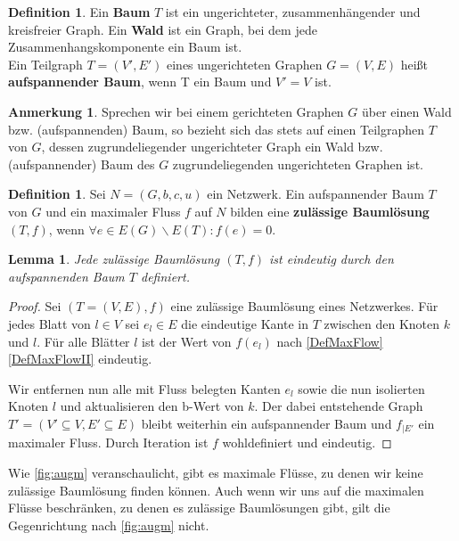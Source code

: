 \documentclass[a4paper,twoside,ngerman]{report}
\theoremstyle{plain}
\newtheorem{lem}[thm]{Lemma}
\theoremstyle{definition}
\newtheorem{defn}[thm]{Definition}
\newtheorem*{anm}{Anmerkung}
\begin{document}
\begin{defn}Ein \textbf{Baum} $T$ ist ein ungerichteter, zusammenhängender und kreisfreier Graph. Ein \textbf{Wald} ist ein Graph, bei dem jede Zusammenhangskomponente ein Baum ist.\\
Ein Teilgraph $T=(V',E')$ eines ungerichteten Graphen $G=(V,E)$ heißt \textbf{aufspannender Baum}, wenn T ein Baum und $V'=V$ ist.\end{defn}
\begin{anm}Sprechen wir bei einem gerichteten Graphen $G$ über einen Wald bzw. (aufspannenden) Baum, so bezieht sich das stets auf einen Teilgraphen $T$ von $G$, dessen zugrundeliegender ungerichteter Graph ein Wald bzw. (aufspannender) Baum des $G$ zugrundeliegenden ungerichteten Graphen ist.\end{anm}

\begin{defn}Sei $N=(G,b,c,u)$ ein Netzwerk. Ein aufspannender Baum $T$ von $G$ und ein maximaler Fluss $f$ auf $N$ bilden eine \textbf{zulässige Baumlösung} $(T,f)$, wenn $\forall e\in E(G)\backslash E(T): f(e) = 0$.\end{defn}

\begin{lem}Jede zulässige Baumlösung $(T,f)$ ist eindeutig durch den aufspannenden Baum $T$ definiert.\end{lem}
\begin{proof}Sei $(T=(V,E),f)$ eine zulässige Baumlösung eines Netzwerkes. Für jedes Blatt von $l\in V$ sei $e_l\in E$ die eindeutige Kante in $T$ zwischen den Knoten $k$ und $l$. Für alle Blätter $l$ ist der Wert von $f(e_l)$ nach \cref{DefMaxFlow} \cref{DefMaxFlowII} eindeutig.
	
Wir entfernen nun alle mit Fluss belegten Kanten $e_l$ sowie die nun isolierten Knoten $l$ und aktualisieren den b-Wert von $k$. Der dabei entstehende Graph $T'=(V'\subseteq V,E'\subseteq E)$ bleibt weiterhin ein aufspannender Baum und $f_{|E'}$ ein maximaler Fluss. Durch Iteration ist $f$ wohldefiniert und eindeutig.\end{proof}

Wie \cref{fig:augm} veranschaulicht, gibt es maximale Flüsse, zu denen wir keine zulässige Baumlösung finden können. Auch wenn wir uns auf die maximalen Flüsse beschränken, zu denen es zulässige Baumlösungen gibt, gilt die Gegenrichtung nach \cref{fig:augm} nicht.
\end{document}

